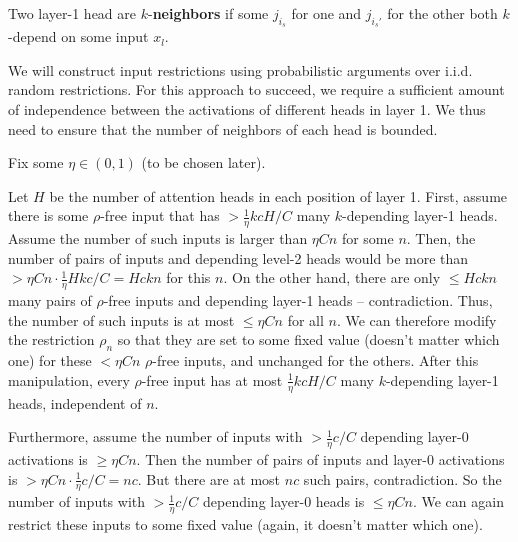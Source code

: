 \documentclass[11pt,a4paper]{article}
\begin{document}
Two layer-1 head are $k$-\textbf{neighbors} if some $j_{i_s}$ for one and $j_{i_s'}$ for the other both $k$-depend on some input $x_l$.



We will construct input restrictions using probabilistic arguments over i.i.d. random restrictions.
For this approach to succeed, we require a  sufficient amount of independence between the activations of different heads in layer 1.
We thus need to ensure that the number of neighbors of each head is bounded.

Fix some $\eta \in (0,1)$ (to be chosen later).

Let $H$ be the number of attention heads in each position of layer 1.
First, assume there is some $\rho$-free input that has $>\frac{1}{\eta}kcH/C$ many $k$-depending layer-1 heads.
Assume the number of such inputs is larger than $\eta Cn$ for some $n$.
Then, the number of pairs of inputs and depending level-2 heads would be more than $> \eta C n \cdot \frac{1}{\eta} H k c/C = Hckn$ for this $n$.
On the other hand, there are only $\leq Hckn$ many pairs of $\rho$-free inputs and depending layer-1 heads -- contradiction.
Thus, the number of such inputs is at most $\leq \eta Cn$ for all $n$.
We can therefore modify the restriction $\rho_n$ so that they are set to some fixed value (doesn't matter which one) for these $<\eta Cn$ $\rho$-free inputs, and unchanged for the others.
After this manipulation, every $\rho$-free input has at most $\frac{1}{\eta}kcH/C$ many $k$-depending layer-1 heads, independent of $n$.

Furthermore, assume the number of inputs with $> \frac{1}{\eta} c/C$ depending layer-0 activations is $\geq \eta Cn$.
Then the number of pairs of inputs and layer-0 activations is $>\eta Cn \cdot \frac{1}{\eta} c/C = nc$.
But there are at most $nc$ such pairs, contradiction.
So the number of inputs with $> \frac{1}{\eta} c/C$ depending layer-0 heads is $\leq \eta Cn$.
We can again restrict these inputs to some fixed value (again, it doesn't matter which one).
\end{document}
